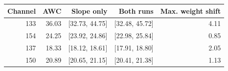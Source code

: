 \begin{tabular}{rrrrr}
\toprule
Channel & AWC & Slope only & Both runs & Max. weight shift\\
\midrule
133 & 36.03 & [32.73, 44.75] & [32.48, 45.72] & 4.11\\
154 & 24.25 & [23.92, 24.86] & [22.98, 25.84] & 0.85\\
137 & 18.33 & [18.12, 18.61] & [17.91, 18.80] & 2.05\\
150 & 20.89 & [20.65, 21.15] & [20.41, 21.38] & 1.13\\
\bottomrule
\end{tabular}
